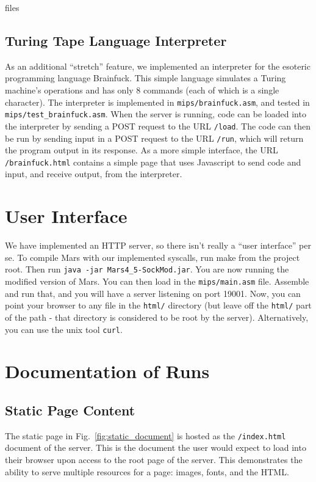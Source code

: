 \documentclass[journal,10pt]{IEEEtran}
\begin{document}
files

\subsection{Turing Tape Language Interpreter}

As an additional ``stretch'' feature, we implemented an interpreter for the
esoteric programming language Brainfuck\cite{Mpreu/preller}.  This simple
language simulates a Turing machine's operations and has only 8 commands (each
of which is a single character).  The interpreter is implemented in
\texttt{mips/brainfuck.asm}, and tested in \texttt{mips/test\_brainfuck.asm}.
When the server is running, code can be loaded into the interpreter by sending a
POST request to the URL \texttt{/load}.  The code can then be run by sending
input in a POST request to the URL \texttt{/run}, which will return the program
output in its response.  As a more simple interface, the URL
\texttt{/brainfuck.html} contains a simple page that uses Javascript to send
code and input, and receive output, from the interpreter.

\section{User Interface}

We have implemented an HTTP server, so there isn’t really a “user interface” per se. To compile Mars with our implemented syscalls, run make from the project root. Then run \texttt{java -jar Mars4\_5-SockMod.jar}. You are now running the modified version of Mars. You can then load in the \texttt{mips/main.asm} file. Assemble and run that, and you will have a server listening on port 19001. Now, you can point your browser to any file in the \texttt{html/} directory (but leave off the \texttt{html/} part of the path - that directory is considered to be root by the server). Alternatively, you can use the unix tool \texttt{curl}.

\section{Documentation of Runs}

\subsection{Static Page Content}

The static page in Fig.~\ref{fig:static_document} is hosted as the \texttt{/index.html} document of the server. This is the document the user would expect to load into their browser upon access to the root page of the server. This demonstrates the ability to serve multiple resources for a page: images, fonts, and the HTML.
\end{document}

